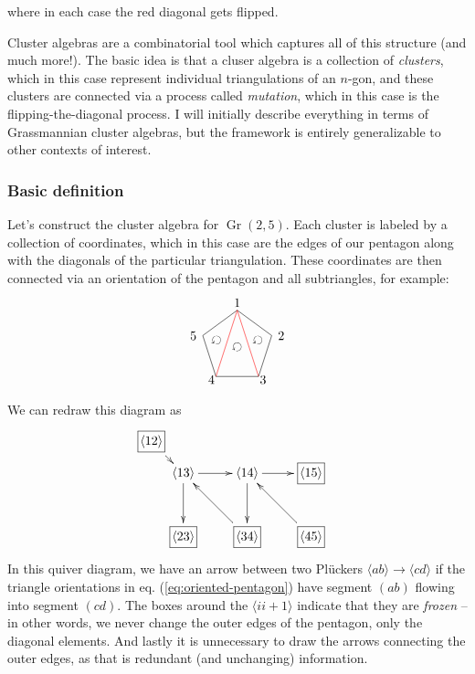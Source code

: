 \documentclass[11pt]{article}
\DeclareMathOperator{\Gr}{Gr}
\def\ket#1{\langle #1 \rangle}
\def\drawLabeledPentagon{
\coordinate (P1) at (90:1);
\coordinate (P2) at (18:1);
\coordinate (P3) at (306:1);
\coordinate (P4) at (234:1);
\coordinate (P5) at (162:1);
\draw (P1) -- (P2) -- (P3) -- (P4) -- (P5) -- cycle;
\draw (0,1.2) node {1};
\draw (1,.3) node[anchor=west] {2};
\draw (.5,-.9) node[anchor=west] {3};
\draw (-.5,-.9) node[anchor=east] {4};
\draw (-1,.3) node[anchor=east] {5};
}
\begin{document}
where in each case the red diagonal gets flipped. 

Cluster algebras are a combinatorial tool which captures all of this structure (and much more!). The basic idea is that a cluser algebra is a collection of \emph{clusters}, which in this case represent individual triangulations of an $n$-gon, and these clusters are connected via a process called \emph{mutation}, which in this case is the flipping-the-diagonal process. I will initially describe everything in terms of Grassmannian cluster algebras, but the framework is entirely generalizable to other contexts of interest.

\subsubsection*{Basic definition}

Let's construct the cluster algebra for $\Gr(2,5)$. Each cluster is labeled by a collection of coordinates, which in this case are the edges of our pentagon along with the diagonals of the particular triangulation. These coordinates are then connected via an orientation of the pentagon and all subtriangles, for example:
\begin{equation}\label{eq:oriented-pentagon}
\begin{tikzpicture}
  \drawLabeledPentagon
  \draw[color=red] (P1) -- (P3);
  \draw[color=red] (P1) -- (P4);
  \draw (18:.6) node[rotate=144] {$\circlearrowleft$};
  \draw (0:0) node[rotate=144] {$\circlearrowleft$};
  \draw (162:.6) node[rotate=144] {$\circlearrowleft$};
\end{tikzpicture} 
\end{equation}
We can redraw this diagram as
\begin{equation}\label{eq:gr25-seed}
\begin{gathered}
\begin{xy} 0;<1pt,0pt>:<0pt,-1pt>::
	(25,25) *+{\langle 13\rangle} ="0",
	(75,25) *+{\langle 14\rangle} ="1",
	(125,25) *+{\framebox[5ex]{$\langle 15\rangle$}} ="2",
	(125,75) *+{\framebox[5ex]{$\langle 45\rangle$}} ="3",
	(75,75) *+{\framebox[5ex]{$\langle 34\rangle$}} ="4",
	(25,75) *+{\framebox[5ex]{$\langle 23\rangle$}} ="5",
	(0,0) *+{\framebox[5ex]{$\langle 12\rangle$}} ="6",
	(145,75) *+{},
	"0", {\ar"1"},
	"4", {\ar"0"},
	"0", {\ar"5"},
	"6", {\ar"0"},
	"1", {\ar"2"},
	"3", {\ar"1"},
	"1", {\ar"4"},
\end{xy}
\end{gathered}
\end{equation}
In this quiver diagram, we have an arrow between two Pl\"uckers $\ket{ab} \to \ket{cd}$ if the triangle orientations in eq. (\ref{eq:oriented-pentagon}) have segment $(ab)$ flowing into segment $(cd)$. The boxes around the $\ket{ii+1}$ indicate that they are \emph{frozen} -- in other words, we never change the outer edges of the pentagon, only the diagonal elements. And lastly it is unnecessary to draw the arrows connecting the outer edges, as that is redundant (and unchanging) information. 
\end{document}
